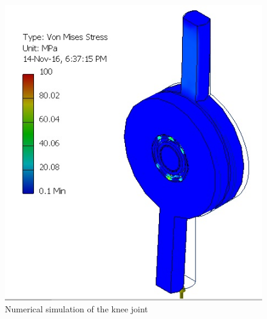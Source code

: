   \begin{figure}[thpb]
      \centering
      \includegraphics[scale=0.5]{Images/Simulacao_Joelho.jpg}
      \caption{Numerical simulation of the knee joint}
      \label{simulacao joelho}
   \end{figure}
   
